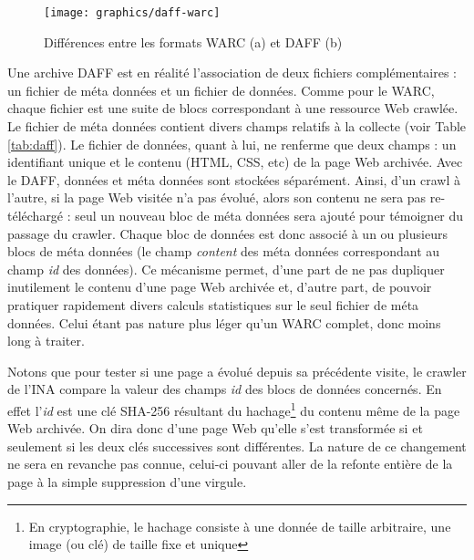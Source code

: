 \documentclass[symmetric,justified,marginals=raggedouter]{tufte-book}
\begin{document}
\begin{figure}%
  \texttt{[image: graphics/daff-warc]}
  \caption{Différences entre les formats WARC (a) et DAFF (b)}
  \label{fig:daff-warc}
\end{figure}

\noindent Une archive DAFF est en réalité l'association de deux fichiers complémentaires : un fichier de méta données et un fichier de données. Comme pour le WARC, chaque fichier est une suite de blocs correspondant à une ressource Web crawlée. Le fichier de méta données contient divers champs relatifs à la collecte (voir Table \ref{tab:daff}). Le fichier de données, quant à lui, ne renferme que deux champs : un identifiant unique et le contenu (HTML, CSS, etc) de la page Web archivée. Avec le DAFF, données et méta données sont stockées séparément. Ainsi, d'un crawl à l'autre, si la page Web visitée n'a pas évolué, alors son contenu ne sera pas re-téléchargé : seul un nouveau bloc de méta données sera ajouté pour témoigner du passage du crawler. Chaque bloc de données est donc associé à un ou plusieurs blocs de méta données (le champ \textit{content} des méta données correspondant au champ \textit{id} des données). Ce mécanisme permet, d'une part de ne pas dupliquer inutilement le contenu d'une page Web archivée et, d'autre part, de pouvoir pratiquer rapidement divers calculs statistiques sur le seul fichier de méta données. Celui étant pas nature plus léger qu'un WARC complet, donc moins long à traiter.

Notons que pour tester si une page a évolué depuis sa précédente visite, le crawler de l'INA compare la valeur des champs \textit{id} des blocs de données concernés. En effet l'\textit{id} est une clé SHA-256 résultant du hachage\footnote{En cryptographie, le hachage consiste à une donnée de taille arbitraire, une image (ou clé) de taille fixe et unique} du contenu même de la page Web archivée. On dira donc d'une page Web qu'elle s'est transformée si et seulement si les deux clés successives sont différentes. La nature de ce changement ne sera en revanche pas connue, celui-ci pouvant aller de la refonte entière de la page à la simple suppression d'une virgule.        
\end{document}
